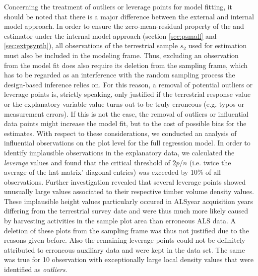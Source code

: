 

Concerning the treatment of outliers or leverage points for model fitting, it should be noted that there is a major difference between the external and internal model approach. In order to ensure the zero-mean-residual property of the \psmall{} and \extpsynth{} estimator under the internal model approach (section \ref{sec:psmall} and \ref{sec:extpsynth}), all observations of the terrestrial sample $s_2$ used for estimation must also be included in the modeling frame. Thus, excluding an observation from the model fit does also require its deletion from the sampling frame, which has to be regarded as an interference with the random sampling process the design-based inference relies on. For this reason, a removal of potential outliers or leverage points is, strictly speaking, only justified if the terrestrial response value or the explanatory variable value turns out to be truly erroneous (e.g. typos or measurement errors). If this is not the case, the removal of outliers or influential data points might increase the model fit, but to the cost of possible bias for the estimates. With respect to these considerations, we conducted an analysis of influential observations \citep[pp. 160--167]{fahrmeir2013} on the plot level for the full regression model. In order to identify implausible observations in the explanatory data, we calculated the \textit{leverage} values and found that the critical threshold of $2p/n$ (i.e. twice the average of the hat matrix' diagonal entries) was exceeded by 10\% of all observations. Further investigation revealed that several leverage points showed unusually large \meanheight{} values associated to their respective timber volume density values. These implausible height values particularly occured in ALSyear acquisition years differing from the terrestrial survey date and were thus much more likely caused by harvesting activities in the sample plot area than erroneous ALS data. A deletion of these plots from the sampling frame was thus not justified due to the reasons given before. Also the remaining leverage points could not be definitely attributed to erroneous auxiliary data and were kept in the data set. The same was true for 10 observation with exceptionally large local density values that were identified as \textit{outliers}.





